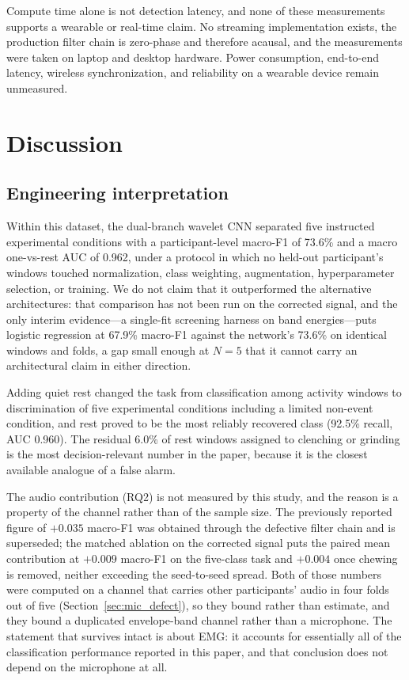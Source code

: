 \documentclass[pdflatex,sn-nature,iicol]{sn-jnl}
\begin{document}
Compute time alone is not detection latency, and none of these measurements supports a wearable or real-time claim. No streaming implementation exists, the production filter chain is zero-phase and therefore acausal, and the measurements were taken on laptop and desktop hardware. Power consumption, end-to-end latency, wireless synchronization, and reliability on a wearable device remain unmeasured.

\section{Discussion}

\subsection{Engineering interpretation}

Within this dataset, the dual-branch wavelet CNN separated five instructed experimental conditions with a participant-level macro-F1 of 73.6\% and a macro one-vs-rest AUC of 0.962, under a protocol in which no held-out participant's windows touched normalization, class weighting, augmentation, hyperparameter selection, or training. We do not claim that it outperformed the alternative architectures: that comparison has not been run on the corrected signal, and the only interim evidence---a single-fit screening harness on band energies---puts logistic regression at 67.9\% macro-F1 against the network's 73.6\% on identical windows and folds, a gap small enough at $N=5$ that it cannot carry an architectural claim in either direction.

Adding quiet rest changed the task from classification among activity windows to discrimination of five experimental conditions including a limited non-event condition, and rest proved to be the most reliably recovered class (92.5\% recall, AUC 0.960). The residual 6.0\% of rest windows assigned to clenching or grinding is the most decision-relevant number in the paper, because it is the closest available analogue of a false alarm.

The audio contribution (RQ2) is not measured by this study, and the reason is a property of the channel rather than of the sample size. The previously reported figure of $+0.035$ macro-F1 was obtained through the defective filter chain and is superseded; the matched ablation on the corrected signal puts the paired mean contribution at $+0.009$ macro-F1 on the five-class task and $+0.004$ once chewing is removed, neither exceeding the seed-to-seed spread. Both of those numbers were computed on a channel that carries other participants' audio in four folds out of five (Section~\ref{sec:mic_defect}), so they bound rather than estimate, and they bound a duplicated envelope-band channel rather than a microphone. The statement that survives intact is about EMG: it accounts for essentially all of the classification performance reported in this paper, and that conclusion does not depend on the microphone at all.
\end{document}
